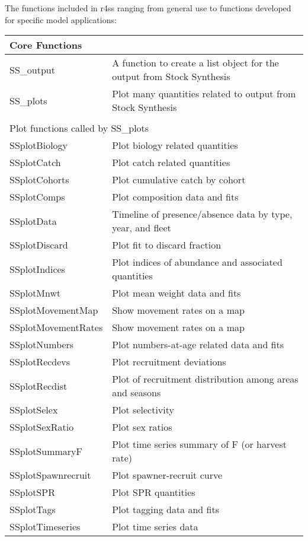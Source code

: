 \pagebreak
The functions included in r4ss ranging from general use to functions developed for specific model applications:
\begin{center}
	\begin{longtable}{p{4.5cm} p{10.52cm}}
		Core Functions & \\
		\hline
		SS\_output & A function to create a list object for the output from Stock Synthesis\\
		SS\_plots  & Plot many quantities related to output from Stock Synthesis\\
		\hline
		\\
		\multicolumn{2}{l}{Plot functions called by SS\_plots} \\
		\hline
		SSplotBiology & Plot biology related quantities \\
		SSplotCatch   & Plot catch related quantities \\
		SSplotCohorts & Plot cumulative catch by cohort \\
		SSplotComps   & Plot composition data and fits \\
		SSplotData    & Timeline of presence/absence data by type, year, and fleet \\
		SSplotDiscard & Plot fit to discard fraction \\
		SSplotIndices & Plot indices of abundance and associated quantities \\
		SSplotMnwt    & Plot mean weight data and fits \\
		SSplotMovementMap & Show movement rates on a map \\
		SSplotMovementRates & Show movement rates on a map \\
		SSplotNumbers & Plot numbers-at-age related data and fits \\
		SSplotRecdevs & Plot recruitment deviations \\
		SSplotRecdist & Plot of recruitment distribution among areas and seasons \\
		SSplotSelex   & Plot selectivity \\
		SSplotSexRatio & Plot sex ratios \\
		SSplotSummaryF & Plot time series summary of F (or harvest rate) \\
		SSplotSpawnrecruit & Plot spawner-recruit curve \\
		SSplotSPR     & Plot SPR quantities \\
		SSplotTags    & Plot tagging data and fits \\
		SSplotTimeseries & Plot time series data \\

\end{longtable}
\end{center}
